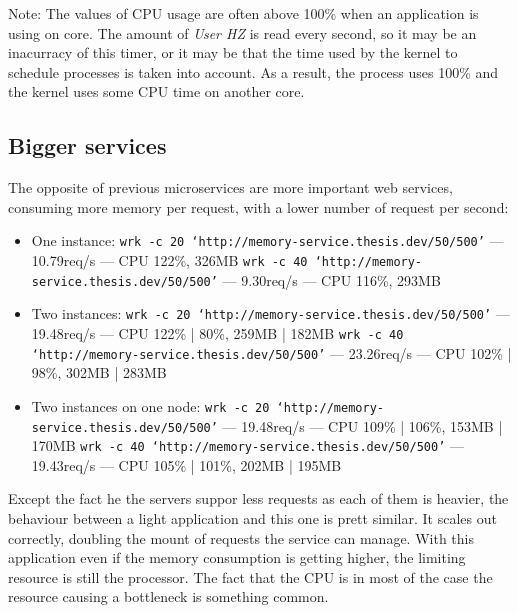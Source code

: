 Note: The values of CPU usage are often above 100\% when an application is
using on core.  The amount of \textit{User HZ} is read every second, so it may
be an inacurracy of this timer, or it may be that the time used by the kernel
to schedule processes is taken into account. As a result, the process uses
100\% and the kernel uses some CPU time on another core.

\subsection{Bigger services}

The opposite of previous microservices are more important web services, consuming
more memory per request, with a lower number of request per second:

\begin{itemize}
	\item{One instance: \newline
	\texttt{wrk -c 20 `http://memory-service.thesis.dev/50/500'} --- 10.79req/s --- CPU 122\%, 326MB \newline
	\texttt{wrk -c 40 `http://memory-service.thesis.dev/50/500'} --- 9.30req/s --- CPU 116\%, 293MB \newline
	\vspace{1em}}
	\item{Two instances: \newline
	\texttt{wrk -c 20 `http://memory-service.thesis.dev/50/500'} --- 19.48req/s --- CPU 122\% | 80\%, 259MB | 182MB \newline
	\texttt{wrk -c 40 `http://memory-service.thesis.dev/50/500'} --- 23.26req/s --- CPU 102\% | 98\%, 302MB | 283MB \newline
	\vspace{1em}}
	\item{Two instances on one node: \newline
	\texttt{wrk -c 20 `http://memory-service.thesis.dev/50/500'} --- 19.48req/s --- CPU 109\% | 106\%, 153MB | 170MB \newline
	\texttt{wrk -c 40 `http://memory-service.thesis.dev/50/500'} --- 19.43req/s --- CPU 105\% | 101\%, 202MB | 195MB \newline
	\vspace{1em}}
\end{itemize}

Except the fact he the servers suppor less requests as each of them is heavier,
the behaviour between a light application and this one is prett similar. It
scales out correctly, doubling the mount of requests the service can manage.
With this application even if the memory consumption is getting higher, the
limiting resource is still the processor. The fact that the CPU is in most of
the case the resource causing a bottleneck is something
common.~\cite{reassignmentElectricitysaving, reassignmentVisbp}

